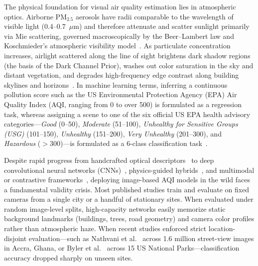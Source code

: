 \documentclass[conference]{IEEEtran}
\newcommand{\pmtwofive}{PM$_{2.5}$}
\begin{document}
The physical foundation for visual air quality estimation lies in atmospheric
optics. Airborne \pmtwofive{} aerosols have radii comparable to the wavelength
of visible light (0.4--0.7~$\mu$m) and therefore attenuate and scatter sunlight
primarily via Mie scattering, governed macroscopically by the Beer--Lambert law
and Koschmieder's atmospheric visibility
model~\cite{marzaguiReviewImageQuality2024, yadavRoadsideTreeImageBased2025}. As
particulate concentration increases, airlight scattered along the line of sight
brightens dark shadow regions (the basis of the Dark Channel Prior), washes out
color saturation in the sky and distant vegetation, and degrades high-frequency
edge contrast along building skylines and
horizons~\cite{chakrabortyCanImageTell2024, dohaDeepMultiTaskLearning2026}. In
machine learning terms, inferring a continuous pollution score such as the US
Environmental Protection Agency (EPA) Air Quality Index (AQI, ranging from 0 to
over 500) is formulated as a regression task, whereas assigning a scene to one
of the six official US EPA health advisory categories---\textit{Good} (0--50),
\textit{Moderate} (51--100), \textit{Unhealthy for Sensitive Groups (USG)}
(101--150), \textit{Unhealthy} (151--200), \textit{Very Unhealthy} (201--300),
and \textit{Hazardous} ($> 300$)---is formulated as a 6-class classification
task~\cite{wangLightweightAirQuality2024,
wangPrototypeFeatureRepresentationGuided2026}.

Despite rapid progress from handcrafted optical
descriptors~\cite{marzaguiReviewImageQuality2024, chakrabortyCanImageTell2024,
yadavRoadsideTreeImageBased2025} to deep convolutional neural networks
(CNNs)~\cite{kaushalEvaluationDeepLearning2024, vermaImagebasedAirPollution2025,
kumaar.bImageBasedAir2025, zhangAirQualityLevel2024}, physics-guided
hybrids~\cite{dohaDeepMultiTaskLearning2026, razimiIntegratingDeepLearning2024a,
leeEnhancingPM25Detection2025}, and multimodal or contrastive
frameworks~\cite{abdelsalamSkyFuseNetCrossAttentionSwin2026,
kambleMobileImageDrivenPM252025, hanSmartCamAirDetectContrastiveApproach2025,
mohanDeepLearningBasedPM252025, vahdatpourForecastingVisualizingAir2025},
deploying image-based AQI models in the wild faces a fundamental validity
crisis. Most published studies train and evaluate on fixed cameras from a single
city or a handful of stationary sites. When evaluated under random image-level
splits, high-capacity networks easily memorize static background landmarks
(buildings, trees, road geometry) and camera color profiles rather than
atmospheric haze. When recent studies enforced strict location-disjoint
evaluation---such as Nathvani et al.~\cite{nathvaniHereNowEvaluating2023} across
1.6 million street-view images in Accra, Ghana, or Byler et
al.~\cite{bylerLocationGeneralizabilityImageBased2025} across 15 US National
Parks---classification accuracy dropped sharply on unseen sites.
\end{document}
